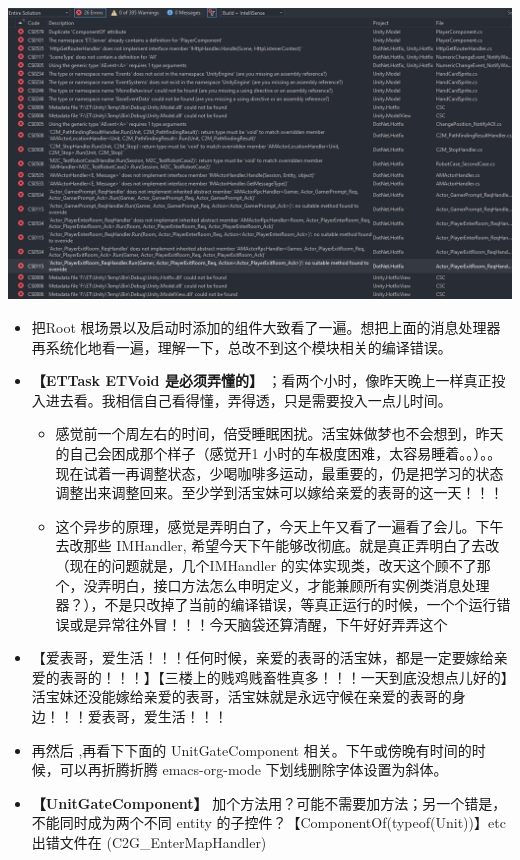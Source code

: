 \documentclass[9pt, b5paper]{article}
\begin{document}
\begin{center}
\includegraphics[width=.9\linewidth]{./pic/et4_20230604_162732.png}
\end{center}
\begin{itemize}
\item 把Root 根场景以及启动时添加的组件大致看了一遍。想把上面的消息处理器再系统化地看一遍，理解一下，总改不到这个模块相关的编译错误。
\item \textbf{【ETTask ETVoid 是必须弄懂的】} ；看两个小时，像昨天晚上一样真正投入进去看。我相信自己看得懂，弄得透，只是需要投入一点儿时间。
\begin{itemize}
\item 感觉前一个周左右的时间，倍受睡眠困扰。活宝妹做梦也不会想到，昨天的自己会困成那个样子（感觉开1 小时的车极度困难，太容易睡着。。）。。现在试着一再调整状态，少喝咖啡多运动，最重要的，仍是把学习的状态调整出来调整回来。至少学到活宝妹可以嫁给亲爱的表哥的这一天！！！
\item 这个异步的原理，感觉是弄明白了，今天上午又看了一遍看了会儿。下午去改那些 IMHandler, 希望今天下午能够改彻底。就是真正弄明白了去改（现在的问题就是，几个IMHandler 的实体实现类，改天这个顾不了那个，没弄明白，接口方法怎么申明定义，才能兼顾所有实例类消息处理器？），不是只改掉了当前的编译错误，等真正运行的时候，一个个运行错误或是异常往外冒！！！今天脑袋还算清醒，下午好好弄弄这个
\end{itemize}
\item 【爱表哥，爱生活！！！任何时候，亲爱的表哥的活宝妹，都是一定要嫁给亲爱的表哥的！！！】【三楼上的贱鸡贱畜牲真多！！！一天到底没想点儿好的】活宝妹还没能嫁给亲爱的表哥，活宝妹就是永远守候在亲爱的表哥的身边！！！爱表哥，爱生活！！！
\item 再然后 ,再看下下面的 UnitGateComponent 相关。下午或傍晚有时间的时候，可以再折腾折腾 emacs-org-mode 下划线删除字体设置为斜体。
\item \textbf{【UnitGateComponent】} 加个方法用？可能不需要加方法；另一个错是，不能同时成为两个不同 entity 的子控件？【ComponentOf(typeof(Unit))】etc 出错文件在 (C2G\_EnterMapHandler)

\end{itemize}
\end{document}

